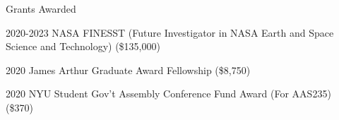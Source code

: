 \begin{cvlist}{Grants Awarded}
\setlength{\itemsep}{0pt}
\setlength{\parskip}{3.5pt}
\item[2020-2023] NASA FINESST (Future Investigator in NASA Earth and Space Science and Technology) (\$135,000)
\item[2020] James Arthur Graduate Award Fellowship (\$8,750)
\item[2020] NYU Student Gov't Assembly Conference Fund Award (For AAS235) (\$370)
\end{cvlist}